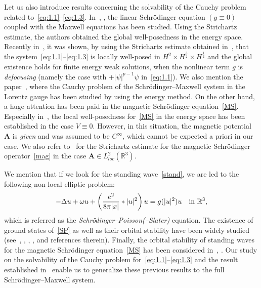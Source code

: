 \documentclass[10pt]{amsart}
\theoremstyle{definition}\newtheorem{defi}[theo]{Definition}\newtheorem{rema}[theo]{Remark}\newtheorem{exam}[theo]{Example}\newtheorem{exem}[theo]{Example}\newtheorem{nota}[theo]{Notation}
\newcommand{\BA}{\mathbf{A}}
\newcommand{\R}{\mathbb{R}}
\begin{document}
Let us also introduce results concerning the solvability of the Cauchy problem related to~\eqref{eq:1.1}--\eqref{eq:1.3}. In~\cite{BT}, \cite{NW}, the linear Schr\"odinger equation $(g \equiv 0)$ coupled with the Maxwell equations has been studied. Using the Strichartz estimate, the authors obtained the global well-posedness in the energy space. Recently in~\cite{AAM}, it was shown, by using the Strichartz estimate obtained in~\cite{NW}, that the system~\eqref{eq:1.1}--\eqref{eq:1.3} is locally well-posed in $H^2 \times H^{\frac{3}{2}} \times H^{\frac{1}{2}}$ and the global existence holds for finite energy weak solutions, when the nonlinear term $g$ is \emph{defocusing} (namely the case with $+|\psi|^{p-1}\psi$ in~\eqref{eq:1.1}). We also mention the paper~\cite{NT}, where the Cauchy problem of the Schr\"odinger--Maxwell system in the Lorentz gauge has been studied by using the energy method. On the other hand, a huge attention has been paid in the magnetic Schr\"odinger equation~\eqref{MS}. Especially in~\cite{M}, the local well-posedness for~\eqref{MS} in the energy space has been established in the case $V \equiv 0$. However, in this situation, the magnetic potential $\BA$ is \emph{given} and was assumed to be $C^{\infty}$, which cannot be expected a priori in our case. We also refer to~\cite{DFVV} for the Strichartz estimate for the magnetic Schr\"odinger operator~\eqref{mag} in the case $\BA \in L^2_{loc}(\R^3)$.

We mention that if we look for the standing wave~\eqref{stand}, we are led to the following non-local elliptic problem:
\begin{equation}\label{SP}
-\Delta u + \omega u + \left(\frac{e^2}{8 \pi|x|} * |u|^2 \right) u = g(|u|^2)u \quad \hbox{in} \ \R^3,
\end{equation}
which is referred as the \emph{Schr\"odinger--Poisson(--Slater)} equation. The existence of ground states of~\eqref{SP} as well as their orbital stability have been widely studied (see~\cite{AP}, \cite{BF}, \cite{BS}, \cite{CDSS}, \cite{K} and references therein). Finally, the orbital stability of standing waves for the magnetic Schr\"odinger equation~\eqref{MS} has been considered in~\cite{CE}, \cite{G}. Our study on the solvability of the Cauchy problem for~\eqref{eq:1.1}--\eqref{eq:1.3} and the result established in~\cite{CW2} enable us to generalize these previous results to the full Schr\"odinger--Maxwell system.
\end{document}
